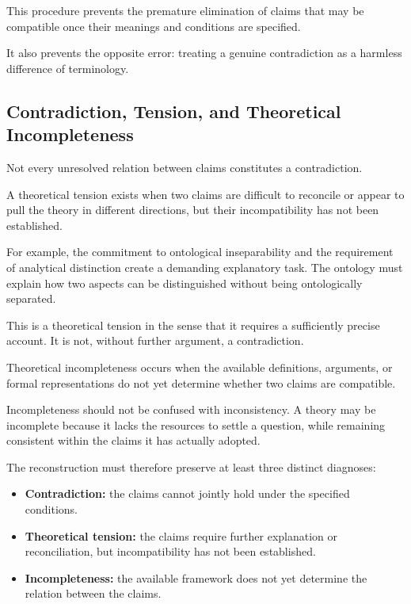 This procedure prevents the premature elimination of
claims that may be compatible once their meanings and
conditions are specified.

It also prevents the opposite error: treating a genuine
contradiction as a harmless difference of terminology.

\subsection{Contradiction, Tension, and Theoretical Incompleteness}

Not every unresolved relation between claims constitutes
a contradiction.

A theoretical tension exists when two claims are difficult
to reconcile or appear to pull the theory in different
directions, but their incompatibility has not been
established.

For example, the commitment to ontological inseparability
and the requirement of analytical distinction create
a demanding explanatory task. The ontology must explain
how two aspects can be distinguished without being
ontologically separated.

This is a theoretical tension in the sense that it
requires a sufficiently precise account. It is not,
without further argument, a contradiction.

Theoretical incompleteness occurs when the available
definitions, arguments, or formal representations do
not yet determine whether two claims are compatible.

Incompleteness should not be confused with inconsistency.
A theory may be incomplete because it lacks the resources
to settle a question, while remaining consistent within
the claims it has actually adopted.

The reconstruction must therefore preserve at least
three distinct diagnoses:

\begin{itemize}
    \item \textbf{Contradiction:} the claims cannot jointly
    hold under the specified conditions.

    \item \textbf{Theoretical tension:} the claims require
    further explanation or reconciliation, but incompatibility
    has not been established.

    \item \textbf{Incompleteness:} the available framework
    does not yet determine the relation between the claims.
\end{itemize}


